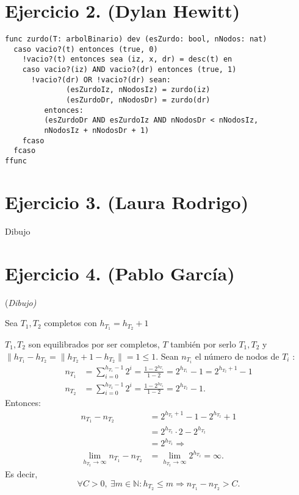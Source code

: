 \documentclass[10pt,a4paper,openright]{book}
\theoremstyle{break}
\begin{document}
\section{Ejercicio 2. (Dylan Hewitt)}%
\label{sec:ejercicio_2_dylan_hewitt_}
\begin{lstlisting}
func zurdo(T: arbolBinario) dev (esZurdo: bool, nNodos: nat)
  caso vacio?(t) entonces (true, 0)
    !vacio?(t) entonces sea (iz, x, dr) = desc(t) en 
    caso vacio?(iz) AND vacio?(dr) entonces (true, 1)
      !vacio?(dr) OR !vacio?(dr) sean:
              (esZurdoIz, nNodosIz) = zurdo(iz)
              (esZurdoDr, nNodosDr) = zurdo(dr) 
         entonces: 
         (esZurdoDr AND esZurdoIz AND nNodosDr < nNodosIz, 
         nNodosIz + nNodosDr + 1)
    fcaso
  fcaso
ffunc
\end{lstlisting}

\section{Ejercicio 3. (Laura Rodrigo)}%
\label{sec:ejercicio_3_laura_rodrigo}
Dibujo

\section{Ejercicio 4. (Pablo García)}%
\label{sec:ejercicio_4_pablo_garcia_}
(\textit{Dibujo)}

Sea $T_1, T_2$ completos con $h_{T_1} = h_{T_2} + 1$

$T_1, T_2$ son equilibrados por ser completos, $T$ también por serlo $T_1, T_2$ y $\| h_{T_1} - h_{T_2} = \|h_{T_2} + 1 - h_{T_2} \| = 1 \le 1$. Sean $n_{T_i}$ el número de nodos de $T_i$ : 
\begin{align*}
    n_{T_1} &= \sum_{i=0}^{h_{T_1} - 1} 2^{i} = \frac{1 - 2^{h_{T_1}}}{1 - 2} = 2^{h_{T_1}} - 1 = 2^{h_{T_2} + 1} - 1\\ 
    n_{T_2} &= \sum_{i=0}^{h_{T_2} - 1} 2^{i} = \frac{1 - 2^{h_{T_2}}}{1 - 2} = 2^{h_{T_2}} - 1
.\end{align*}
Entonces: 
\begin{align*}
    n_{T_1} - n_{T_2} &= 2^{h_{T_2} + 1} - 1 - 2^{h_{T_2}} + 1\\
                    &= 2^{h_{T_2}} \cdot 2 - 2^{h_{T_2}} \\
                    &= 2^{h_{T_2}} \Rightarrow\\
    \lim_{h_{T_2} \rightarrow \infty} n_{T_1} - n_{T_2} &= \lim_{h_{T_2} \rightarrow \infty} 2^{h_{T_2}} = \infty  
.\end{align*}
Es decir, 
\[
\forall C > 0,\ \exists m \in \mathbb{N} : h_{T_2} \le m \Rightarrow n_{T_1} - n_{T_2} > C.
\]
\end{document}
